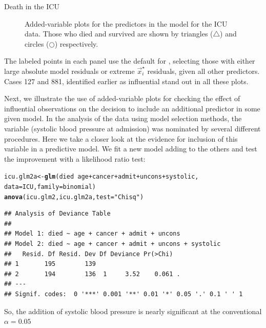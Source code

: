 \documentclass[11pt]{book}\usepackage[]{graphicx}\usepackage[]{color}
\makeatletter
\newcommand{\hlstr}[1]{\textcolor[rgb]{0.192,0.494,0.8}{#1}}%
\newcommand{\hlopt}[1]{\textcolor[rgb]{0,0,0}{#1}}%
\newcommand{\hlstd}[1]{\textcolor[rgb]{0.345,0.345,0.345}{#1}}%
\newcommand{\hlkwb}[1]{\textcolor[rgb]{0.69,0.353,0.396}{#1}}%
\newcommand{\hlkwc}[1]{\textcolor[rgb]{0.333,0.667,0.333}{#1}}%
\newcommand{\hlkwd}[1]{\textcolor[rgb]{0.737,0.353,0.396}{\textbf{#1}}}%
\newenvironment{kframe}{%
 \def\at@end@of@kframe{}%
 \ifinner\ifhmode%
  \def\at@end@of@kframe{\end{minipage}}%
  \begin{minipage}{\columnwidth}%
 \fi\fi%
 \def\FrameCommand##1{\hskip\@totalleftmargin \hskip-\fboxsep
 \colorbox{shadecolor}{##1}\hskip-\fboxsep
     \hskip-\linewidth \hskip-\@totalleftmargin \hskip\columnwidth}%
 \MakeFramed {\advance\hsize-\width
   \@totalleftmargin\z@ \linewidth\hsize
   \@setminipage}}%
 {\par\unskip\endMakeFramed%
 \at@end@of@kframe}
\newenvironment{knitrout}{}{} %
\renewenvironment{knitrout}{\small\renewcommand{\baselinestretch}{.85}}{} %
\makeatother
\begin{document}
\begin{Example}[icu3]{Death in the ICU}
\begin{knitrout}
\begin{figure}[!htb]
\caption[Added-variable plots for the predictors in the model for the ICU data.]{Added-variable plots for the predictors in the model for the ICU data. Those who died and survived are shown by triangles ($\triangle$) and circles (\small{$\bigcirc$}) respectively.\label{fig:icu3-avp1}}
\end{figure}


\end{knitrout}
The labeled points in each panel use the default  for
, selecting those with either large absolute model residuals or
extreme $\vec{x}_i^\star$ residuals, given all other predictors.
Cases 127 and 881, identified earlier as influential stand out in all these
plots.

Next, we illustrate the use of added-variable plots for checking the 
effect of influential observations on the decision to include 
an additional predictor in some given model.  
In the analysis of the  data using model selection methods,
the variable  (systolic blood pressure at admission)
was nominated by several different procedures.  Here we take a closer look
at the evidence for inclusion of this variable in a predictive model.
We fit a new model adding  to the others and test
the improvement with a likelihood ratio test:
\begin{knitrout}
\color{fgcolor}\begin{kframe}
\begin{alltt}
\hlstd{icu.glm2a} \hlkwb{<-} \hlkwd{glm}\hlstd{(died} \hlopt{~} \hlstd{age} \hlopt{+} \hlstd{cancer}  \hlopt{+} \hlstd{admit} \hlopt{+} \hlstd{uncons} \hlopt{+} \hlstd{systolic,}
                 \hlkwc{data}\hlstd{=ICU,} \hlkwc{family}\hlstd{=binomial)}
\hlkwd{anova}\hlstd{(icu.glm2, icu.glm2a,} \hlkwc{test}\hlstd{=}\hlstr{"Chisq"}\hlstd{)}
\end{alltt}
\begin{verbatim}
## Analysis of Deviance Table
## 
## Model 1: died ~ age + cancer + admit + uncons
## Model 2: died ~ age + cancer + admit + uncons + systolic
##   Resid. Df Resid. Dev Df Deviance Pr(>Chi)  
## 1       195        139                       
## 2       194        136  1     3.52    0.061 .
## ---
## Signif. codes:  0 '***' 0.001 '**' 0.01 '*' 0.05 '.' 0.1 ' ' 1
\end{verbatim}
\end{kframe}
\end{knitrout}
So, the addition of systolic blood pressure is nearly significant at the conventional $\alpha=0.05$

\end{Example}
\end{document}
